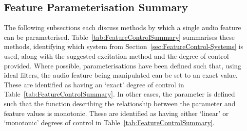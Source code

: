 	\subsection{Feature Parameterisation Summary}
		The following subsections each discuss methods by which a single audio feature can be parameterised.
		Table~\ref{tab:FeatureControlSummary} summarises these methods, identifying which system from
		Section~\ref{sec:FeatureControl-Systems} is used, along with the suggested excitation method and the degree
		of control provided. Where possible, parameterisations have been defined such that, using ideal filters,
		the audio feature being manipulated can be set to an exact value. These are identified as having an `exact'
		degree of control in Table~\ref{tab:FeatureControlSummary}. In other cases, the parameter is defined such
		that the function describing the relationship between the parameter and feature values is monotonic. These
		are identified as having either `linear' or `monotonic' degrees of control in
		Table~\ref{tab:FeatureControlSummary}. 
		
